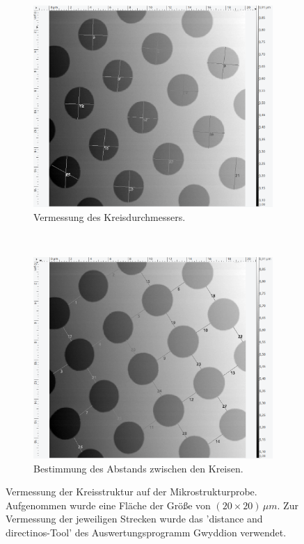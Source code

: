 \begin{figure}[H]
\centering
	\begin{subfigure}[t]{0.45\textwidth}
	\includegraphics[width=\textwidth]{AFM_auswertung/Kreis_durch_vor.png}
	\caption{Vermessung des Kreisdurchmessers.}
	\label{abb:kreisa}
	\end{subfigure}
	~
	\begin{subfigure}[t]{0.45\textwidth}
	\includegraphics[width=\textwidth]{AFM_auswertung/Kreis_abs_vor.png}
	\caption{Bestimmung des Abstands zwischen den Kreisen.}
	\label{abb:kreisb}
	\end{subfigure}
\caption{Vermessung der Kreisstruktur auf der Mikrostrukturprobe. Aufgenommen wurde eine Fl\"ache der Gr\"o{\ss}e von $(20 \times 20) \, \mu m$. Zur Vermessung der jeweiligen Strecken wurde das 'distance and directinos-Tool' des Auswertungsprogramm Gwyddion verwendet.}
\label{abb:kreis}
\end{figure}


